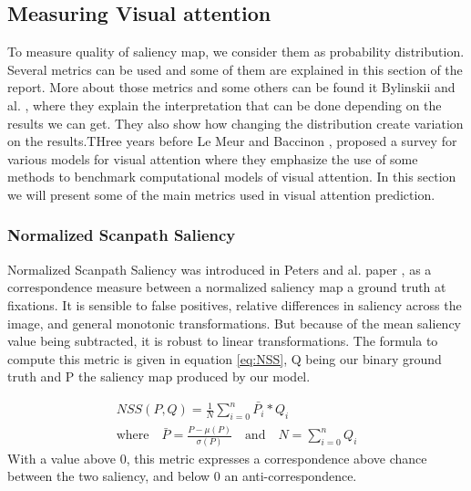 \subsection{Measuring Visual attention}\label{seq:metrics}
To measure quality of saliency map, we consider them as probability distribution. Several metrics can be used and some of them are explained in this section of the report. More about those metrics and some others can be found it Bylinskii and al. \cite{metricsreview}, where they explain the interpretation that can be done depending on the results we can get. They also show how changing the distribution create variation on the results.THree years before Le Meur and Baccinon \cite{LeMeur2013}, proposed a survey for various models for visual attention where they emphasize the use of some methods to benchmark computational models of visual attention.
In this section we will present some of the main metrics used in visual attention prediction.

\subsubsection{Normalized Scanpath Saliency}
Normalized Scanpath Saliency was introduced in Peters and al. paper \cite{Peters2005ComponentsOB}, as a correspondence measure between a normalized saliency map a ground truth at fixations. It is sensible to false positives, relative differences  in  saliency  across  the  image,  and  general   monotonic  transformations. But because of the mean saliency value being subtracted, it is robust to linear transformations. The formula to compute this metric is given in equation \ref{eq:NSS}, Q being our binary ground truth and P the saliency map produced by our model. 

\begin{equation}  
\begin{aligned}
    NSS(P,Q) = \frac{1}{N} \sum\limits_{i=0}^n \bar{P_i} * Q_i\\
    \textrm{where} \quad  \bar{P}= \frac{P - \mu(P)}{\sigma(P)} \quad \textrm{and} \quad  N =  \sum\limits_{i=0}^n Q_i
\end{aligned}
\label{eq:NSS}
\end{equation}
With a value above 0, this metric expresses a correspondence above chance between the two saliency, and below 0 an anti-correspondence.

